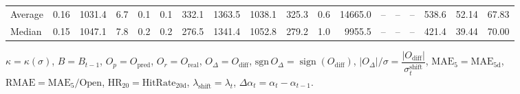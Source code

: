\begin{threeparttable}
{\begin{tabular}{lrrrrrrrrrrrrrrrrr}
Average &     0.16 & 1031.4 &               6.7 &               0.1 &                0.1 &              332.1 & 1363.5 & 1038.1 &      325.3 &                      0.6 &             14665.0 &         -- &        -- &             -- &            538.6 &           52.14 &                  67.83 \\
 Median &     0.15 & 1047.1 &               7.8 &               0.2 &                0.2 &              276.5 & 1341.4 & 1052.8 &      279.2 &                      1.0 &              9955.5 &         -- &        -- &             -- &            421.4 &           39.44 &                  70.00 \\
\bottomrule
\end{tabular}
}
\begin{tablenotes}\footnotesize
\item $\kappa=\kappa(\sigma)$, $B=B_{t-1}$, $O_p=O_{\text{pred}}$, $O_r=O_{\text{real}}$, $O_\Delta=O_{\text{diff}}$, $\mathrm{sgn}\,O_\Delta=\operatorname{sign}(O_{\text{diff}})$, $|O_\Delta|/\sigma=\dfrac{|O_{\text{diff}}|}{\sigma_t^{\text{shift}}}$, $\mathrm{MAE}_5=\mathrm{MAE}_{5\text{d}}$, $\mathrm{RMAE}= \mathrm{MAE}_5 / \text{Open}$, $\mathrm{HR}_{20}=\mathrm{HitRate}_{20\text{d}}$, 
$\lambda_{\text{shift}}=\lambda_t$, 
$\Delta\alpha_t=\alpha_t-\alpha_{t-1}$.
\end{tablenotes}
\end{threeparttable}
\endgroup

